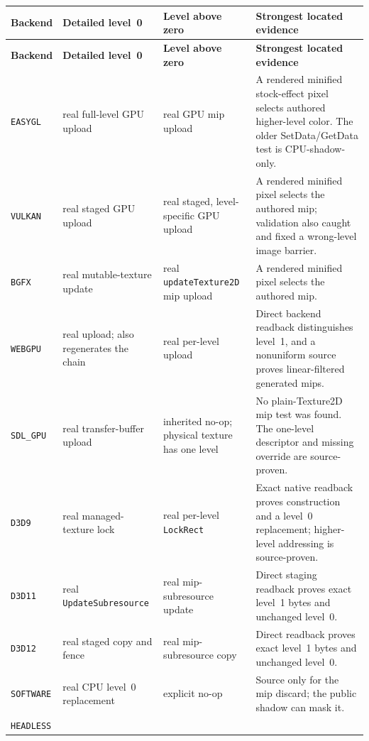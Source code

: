 \begingroup
\small
\setlength{\tabcolsep}{3.5pt}
\renewcommand{\arraystretch}{1.15}
\begin{longtable}{@{}p{}p{}p{}p{}@{}}
\toprule
\textbf{Backend} & \textbf{Detailed level~0} & \textbf{Level above zero} &
  \textbf{Strongest located evidence} \\
\midrule
\endfirsthead
\toprule
\textbf{Backend} & \textbf{Detailed level~0} & \textbf{Level above zero} &
  \textbf{Strongest located evidence} \\
\midrule
\endhead
\texttt{EASYGL}
  & real full-level GPU upload & real GPU mip upload
  & A rendered minified stock-effect pixel selects authored higher-level color. The older
    SetData/GetData test is CPU-shadow-only. \\
\texttt{VULKAN}
  & real staged GPU upload & real staged, level-specific GPU upload
  & A rendered minified pixel selects the authored mip; validation also caught and fixed a
    wrong-level image barrier. \\
\texttt{BGFX}
  & real mutable-texture update & real \texttt{updateTexture2D} mip upload
  & A rendered minified pixel selects the authored mip. \\
\texttt{WEBGPU}
  & real upload; also regenerates the chain & real per-level upload
  & Direct backend readback distinguishes level~1, and a nonuniform source proves
    linear-filtered generated mips. \\
\texttt{SDL\_GPU}
  & real transfer-buffer upload & inherited no-op; physical texture has one level
  & No plain-Texture2D mip test was found. The one-level descriptor and missing override are
    source-proven. \\
\texttt{D3D9}
  & real managed-texture lock & real per-level \texttt{LockRect}
  & Exact native readback proves construction and a level~0 replacement; higher-level
    addressing is source-proven. \\
\texttt{D3D11}
  & real \texttt{UpdateSubresource} & real mip-subresource update
  & Direct staging readback proves exact level~1 bytes and unchanged level~0. \\
\texttt{D3D12}
  & real staged copy and fence & real mip-subresource copy
  & Direct readback proves exact level~1 bytes and unchanged level~0. \\
\texttt{SOFTWARE}
  & real CPU level~0 replacement & explicit no-op
  & Source only for the mip discard; the public shadow can mask it. \\
\texttt{HEADLESS}

\end{longtable}
